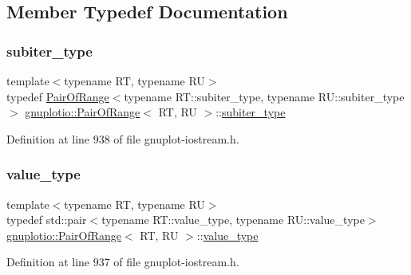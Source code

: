 \subsection{Member Typedef Documentation}
\mbox{\label{classgnuplotio_1_1_pair_of_range_a6a7bf8a5dd4ca0563eb71b1156d6cd9f}} 
\subsubsection{\texorpdfstring{subiter\+\_\+type}{subiter\_type}}
{\footnotesize\ttfamily template$<$typename RT, typename RU$>$ \\
typedef \hyperlink{classgnuplotio_1_1_pair_of_range}{Pair\+Of\+Range}$<$typename R\+T\+::subiter\+\_\+type, typename R\+U\+::subiter\+\_\+type$>$ \hyperlink{classgnuplotio_1_1_pair_of_range}{gnuplotio\+::\+Pair\+Of\+Range}$<$ RT, RU $>$\+::\hyperlink{classgnuplotio_1_1_pair_of_range_a6a7bf8a5dd4ca0563eb71b1156d6cd9f}{subiter\+\_\+type}}



Definition at line 938 of file gnuplot-\/iostream.\+h.

\mbox{\label{classgnuplotio_1_1_pair_of_range_a0cc8b0cc4d9c3377c43843ed9a658eeb}} 
\subsubsection{\texorpdfstring{value\+\_\+type}{value\_type}}
{\footnotesize\ttfamily template$<$typename RT, typename RU$>$ \\
typedef std\+::pair$<$typename R\+T\+::value\+\_\+type, typename R\+U\+::value\+\_\+type$>$ \hyperlink{classgnuplotio_1_1_pair_of_range}{gnuplotio\+::\+Pair\+Of\+Range}$<$ RT, RU $>$\+::\hyperlink{classgnuplotio_1_1_pair_of_range_a0cc8b0cc4d9c3377c43843ed9a658eeb}{value\+\_\+type}}



Definition at line 937 of file gnuplot-\/iostream.\+h.



